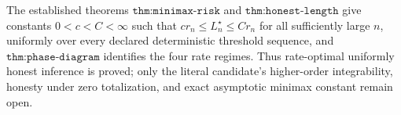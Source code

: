 The established theorems \(\texttt{thm:minimax-risk}\) and \(\texttt{thm:honest-length}\) give constants \(0<c<C<\infty\) such that \(c r_n\leq L_n^\star\leq C r_n\) for all sufficiently large \(n\), uniformly over every declared deterministic threshold sequence, and \(\texttt{thm:phase-diagram}\) identifies the four rate regimes. Thus rate-optimal uniformly honest inference is proved; only the literal candidate's higher-order integrability, honesty under zero totalization, and exact asymptotic minimax constant remain open.